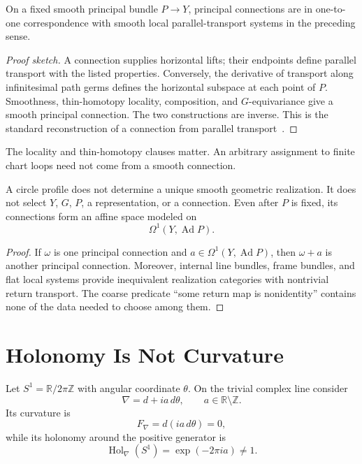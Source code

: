 \documentclass[11pt]{article}
\newcommand{\Hol}{\operatorname{Hol}}
\newcommand{\Ad}{\operatorname{Ad}}
\begin{document}
\begin{theorem}
\label{thm:connection-transport}
On a fixed smooth principal bundle $P\to Y$, principal connections are in
one-to-one correspondence with smooth local parallel-transport systems in the
preceding sense.
\end{theorem}

\begin{proof}[Proof sketch]
A connection supplies horizontal lifts; their endpoints define parallel
transport with the listed properties.  Conversely, the derivative of
transport along infinitesimal path germs defines the horizontal subspace at
each point of $P$.  Smoothness, thin-homotopy locality, composition, and
$G$-equivariance give a smooth principal connection.  The two constructions
are inverse.  This is the standard reconstruction of a connection from
parallel transport~\cite{KobayashiNomizu,SchreiberWaldorf}.
\end{proof}

The locality and thin-homotopy clauses matter.  An arbitrary assignment to
finite chart loops need not come from a smooth connection.

\begin{proposition}
\label{prop:no-unique-connection}
A circle profile does not determine a unique smooth geometric realization.
It does not select $Y$, $G$, $P$, a representation, or a connection.
Even after $P$ is fixed, its connections form an affine space modeled on
\[
 \Omega^1(Y,\Ad P).
\]
\end{proposition}

\begin{proof}
If $\omega$ is one principal connection and
$a\in\Omega^1(Y,\Ad P)$, then $\omega+a$ is another principal connection.
Moreover, internal line bundles, frame bundles, and flat local systems provide
inequivalent realization categories with nontrivial return transport.  The
coarse predicate ``some return map is nonidentity'' contains none of the data
needed to choose among them.
\end{proof}

\section{Holonomy Is Not Curvature}

Let $S^1=\mathbb R/2\pi\mathbb Z$ with angular coordinate $\theta$.  On the
trivial complex line consider
\[
 \nabla=d+ia\,d\theta,\qquad a\in\mathbb R\setminus\mathbb Z.
\]
Its curvature is
\[
 F_\nabla=d(ia\,d\theta)=0,
\]
while its holonomy around the positive generator is
\[
 \Hol_\nabla(S^1)=\exp(-2\pi ia)\ne1.
\]
\end{document}
